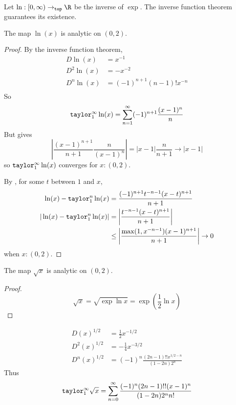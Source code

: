 \documentclass[10pt]{scrartcl}
\newcommand{\cattop}{\mathtt{top}}
\numberwithin{thms}{section}
\begin{document}
\begin{defn}[$\ln$]
  Let $\ln:[0,\infty)\to_\cattop\R$ be the inverse of $\exp$. The inverse function theorem guarantees its existence.
\end{defn}

\begin{theorem}
  The map $\ln (x)$ is analytic on $(0,2)$. 
\end{theorem}
\begin{proof}
  By the inverse function theorem, 
  \begin{align*}
    D\ln(x)&=x^{-1} \\
    D^2\ln(x)&=-x^{-2}\\
    D^n\ln(x)&=(-1)^{n+1}(n-1)!x^{-n}\\
  \end{align*}
  So 
  \[
  \mathtt{taylor}_1^\infty\ln(x)=\sum_{n=1}^\infty (-1)^{n+1}\frac{(x-1)^{n}}{n}
  \]
  But  gives 
  \[
  \left|\frac{(x-1)^{n+1}}{n+1}\frac{n}{(x-1)^n}\right|=|x-1|\frac{n}{n+1}\to |x-1|
  \]
  so $\mathtt{taylor}_1^\infty\ln(x)$ converges for $x:(0,2)$.

  By , for some $t$ between $1$ and $x$, 
  \begin{align*}
    \ln(x)-\mathtt{taylor}_1^n\ln(x) &= \frac{(-1)^{n+1}t^{-n-1}(x-t)^{n+1}}{n+1}\\
    |\ln(x)-\mathtt{taylor}_1^n\ln(x)| &= \left| \frac{t^{-n-1}(x-t)^{n+1}}{n+1}\right|\\
                             &\leq \left|\frac{\max(1,x^{-n-1})(x-1)^{n+1}}{n+1}\right|\to 0
  \end{align*}
  when $x:(0,2)$. 
\end{proof}

\begin{cor}
  The map $\sqrt{x}$ is analytic on $(0,2)$. 
\end{cor}
\begin{proof}
  \[
  \sqrt{x}=\sqrt{\exp\ln x}=\exp\left(\frac 1 2 \ln x\right)
  \]
\end{proof}
\begin{example}
  \begin{align*}
    D(x)^{1/2}&=\frac 1 2 x^{-1/2}\\
    D^2(x)^{1/2}&=-\frac 1 4 x^{-3/2}\\
    D^n(x)^{1/2}&=(-1)^{n}\frac{(2n-1)!! x^{1/2-n}}{(1-2n)2^n}
  \end{align*}
  Thus
  \[
  \mathtt{taylor}_1^\infty \sqrt{x}=\sum_{n=0}^\infty \frac{(-1)^{n}
    (2n-1)!!(x-1)^n}{(1-2n)2^nn!}
  \]
\end{example}
\end{document}
